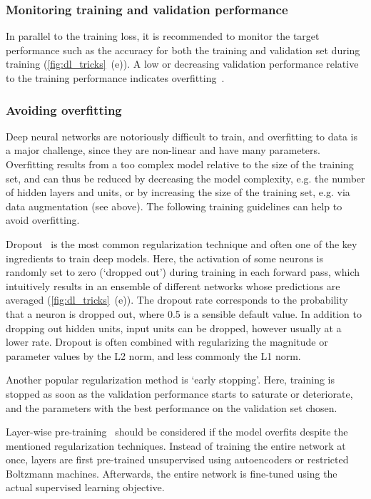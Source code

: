 \subsubsection{Monitoring training and validation performance}
In parallel to the training loss, it is recommended to monitor the target performance such as the accuracy for both the training and validation set during training (\autoref{fig:dl_tricks}~(e)). A low or decreasing validation performance relative to the training performance indicates overfitting~\citep{bengio_practical_2012,karpathy_cs231n_2016}.

\subsubsection{Avoiding overfitting}
Deep neural networks are notoriously difficult to train, and overfitting to data is a major challenge, since they are non-linear and have many parameters. Overfitting results from a too complex model relative to the size of the training set, and can thus be reduced by decreasing the model complexity, e.g. the number of hidden layers and units, or by increasing the size of the training set, e.g. via data augmentation (see above). The following training guidelines can help to avoid overfitting.

Dropout~\citep{srivastava_dropout:_2014} is the most common regularization technique and often one of the key ingredients to train deep models. Here, the activation of some neurons is randomly set to zero (`dropped out') during training in each forward pass, which intuitively results in an ensemble of different networks whose predictions are averaged (\autoref{fig:dl_tricks}~(e)). The dropout rate corresponds to the probability that a neuron is dropped out, where 0.5 is a sensible default value. In addition to dropping out hidden units, input units can be dropped, however usually at a lower rate. Dropout is often combined with regularizing the magnitude or parameter values by the L2 norm, and less commonly the L1 norm.

Another popular regularization method is `early stopping'. Here, training is stopped as soon as the validation performance starts to saturate or deteriorate, and the parameters with the best performance on the validation set chosen.

Layer-wise pre-training~\citep{bengio_greedy_2007,salakhutdinov_efficient_2012} should be considered if the model overfits despite the mentioned regularization techniques. Instead of training the entire network at once, layers are first pre-trained unsupervised using autoencoders or restricted Boltzmann machines. Afterwards, the entire network is fine-tuned using the actual supervised learning objective.

